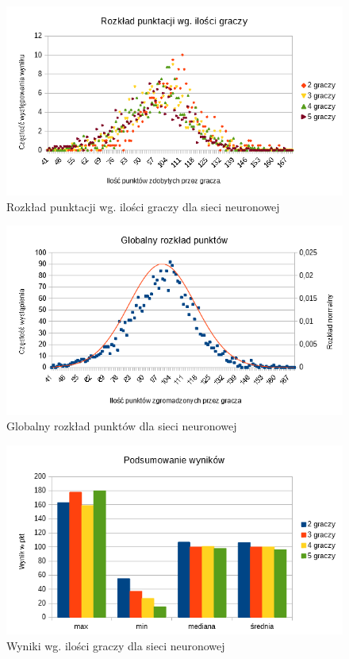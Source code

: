 \documentclass[12pt, oneside]{report}
\begin{document}
	\begin{figure}[h]
		\includegraphics[width=\linewidth]{NNWykrespunktow.png}
		\caption{Rozkład punktacji wg. ilości graczy dla sieci neuronowej}
		\label{figure:player_points_nn}
	\end{figure}
	
	\begin{figure}[h]
		\includegraphics[width=\linewidth]{GaussNNWykrespunktowglobal.png}
		\caption{Globalny rozkład punktów dla sieci neuronowej}
		\label{figure:global_points_nn}
	\end{figure}
	
	\begin{figure}[h]
		\includegraphics[width=\linewidth]{NNWynikWPkt.png}
		\caption{Wyniki wg. ilości graczy dla sieci neuronowej}
		\label{figure:min_max_nn}
	\end{figure}
	
\end{document}
